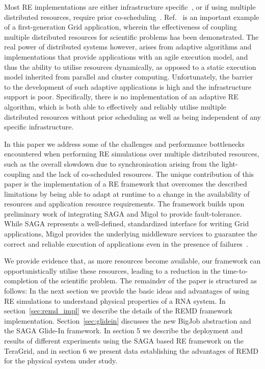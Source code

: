 \documentclass{rspublic}
\begin{document}
Most RE implementations are either infrastructure
specific~\citep{Woods:2005nx}, or if using multiple distributed
resources, require prior co-scheduling~\citep{repex_mpig}.
Ref.~\citep{repex_mpig} is an important example of a first-generation
Grid application, wherein the effectiveness of coupling multiple
distributed resources for scientific problems has been demonstrated.
The real power of distributed systems however, arises from adaptive
algorithms and implementations that provide applications with an agile
execution model, and thus the ability to utilise resources
dynamically, as opposed to a static execution model inherited from
parallel and cluster computing.  Unfortunately, the barrier to the
development of such adaptive applications is high and the
infrastructure support is poor.
Specifically, there is no implementation of an
adaptive RE algorithm, which is both able to effectively and reliably
utilise multiple distributed resources without prior scheduling as
well as being independent of any specific %
infrastructure.

In this paper we address some of the challenges and performance
bottlenecks encountered when performing RE simulations over multiple
distributed resources, such as the overall slowdown due to
synchronisation arising from the light-coupling and the lack of
co-scheduled resources.  The unique contribution of this paper is the
implementation of a RE framework that overcomes the described
limitations by being able to adapt at runtime to a change in the
availability of resources and application resource requirements.  The
framework builds upon preliminary work of integrating SAGA and Migol to
provide fault-tolerance.
While SAGA represents a well-defined, standardized interface for writing
Grid applications, Migol provides the underlying middleware services
to guarantee the correct and reliable exe\-cution of applications even
in the presence of failures~\citep{Luckow:2008la}.

We provide evidence that, as more resources become
available, our framework can opportunistically utilise these resources,
leading to a reduction in the time-to-completion of the scientific
problem.  The remainder of the paper is structured as follows: In the
next section we provide the basic ideas and advantages of using RE
simulations to understand physical properties of a RNA system. In
section~\ref{sec:remd_impl} we describe the details of the REMD
framework implementation. Section~\ref{sec:glidein} discusses the new BigJob
abstraction and the SAGA Glide-In framework.  
In section 5 we describe the deployment and results of different experiments
using the SAGA based RE framework on the TeraGrid, and in section 6 we
present data establishing the advantages of REMD for the physical
system under study. 
\end{document}

